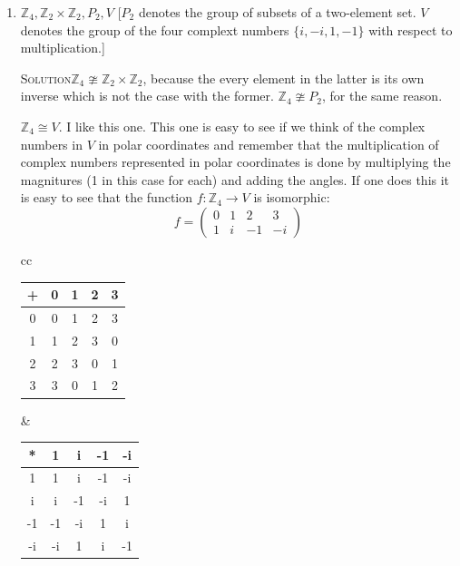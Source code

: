 \documentclass[twoside]{amsart}
\newcommand{\solution}{\textsc{Solution}\xspace}
\newcommand{\iso}{\cong}
\newcommand{\niso}{\ncong}
\newcommand{\blank}{\vspace{5pt}}
\begin{document}
\begin{enumerate}[A.]
   \begin{enumerate}[1]
      \item $\mathbb{Z}_4, \mathbb{Z}_2 \times \mathbb{Z}_2,
      P_2, V$ [$P_2$ denotes the group of subsets of a two-element
      set. $V$ denotes the group of the four complext numbers
      $\{i, -i, 1, -1\}$ with respect to multiplication.]

      \blank \noindent \solution $\mathbb{Z}_4 \niso \mathbb{Z}_2
      \times \mathbb{Z}_2$, because the every element in the latter
      is its own inverse which is not the case with the former. 
      $\mathbb{Z}_4 \niso P_2$, for the same reason.

      $\mathbb{Z}_4 \iso V$. I like this one. This one is easy to
      see if we think of the complex numbers in $V$ in polar
      coordinates and remember that the multiplication of 
      complex numbers represented in polar coordinates is done by
      multiplying the magnitures (1 in this case for each) and
      adding the angles. If one does this it is easy to see
      that the function $f : \mathbb{Z}_4 \to V$ is isomorphic:
      \[
         f = 
         \begin{pmatrix}
            0 & 1 & 2 & 3 \\
            1 & i & -1 & -i 
         \end{pmatrix}
      \]


      \begin{center}
         \begin{tabular}{cc}
            \begin{tabular}{c|cccc}
               + & 0 & 1 & 2 & 3 \\ \hline
               0 & 0 & 1 & 2 & 3 \\
               1 & 1 & 2 & 3 & 0 \\
               2 & 2 & 3 & 0 & 1 \\
               3 & 3 & 0 & 1 & 2
            \end{tabular} &
            \begin{tabular}{c|cccc}
               *  &  1 &  i & -1 & -i \\ \hline
               1  &  1 &  i & -1 & -i \\
               i  &  i & -1 & -i &  1 \\
               -1 & -1 & -i &  1 &  i \\
               -i & -i &  1 &  i & -1
            \end{tabular}
         \end{tabular}
      \end{center}
      \blank


\end{enumerate}
\end{enumerate}
\end{document}

